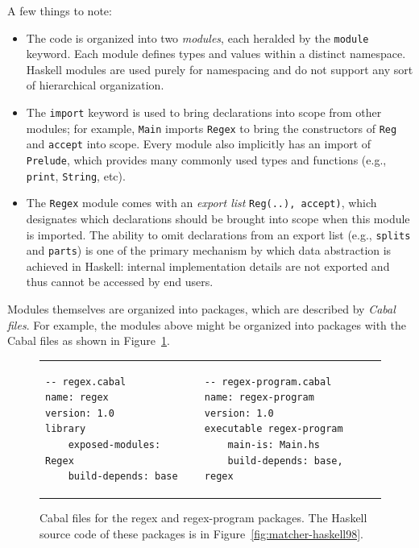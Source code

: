 A few things to note:

\begin{itemize}
    \item The code is organized into two \emph{modules}, each heralded
    by the \verb|module| keyword.  Each module defines types and values
    within a distinct namespace.  Haskell modules are used purely for
    namespacing and do not support any sort of hierarchical organization.

    \item The \verb|import| keyword is used to bring declarations into
    scope from other modules; for example, \verb|Main| imports \verb|Regex|
    to bring the constructors of \verb|Reg| and \verb|accept| into scope.
    Every module also implicitly has an import of \verb|Prelude|, which
    provides many commonly used types and functions (e.g., \verb|print|,
    \verb|String|, etc).

    \item The \verb|Regex| module comes with an \emph{export list}
    \verb|Reg(..), accept)|, which designates which declarations should
    be brought into scope when this module is imported.  The ability to
    omit declarations from an export list (e.g., \verb|splits| and \verb|parts|)
    is one of the primary mechanism by which data abstraction is achieved in
    Haskell: internal implementation details are not exported and thus
    cannot be accessed by end users.
\end{itemize}

Modules themselves are organized into packages, which are described by
\emph{Cabal files}.  For example, the modules above might be organized into
packages with the Cabal files as shown in Figure~\ref{fig:matcher-packages}.

\begin{figure}
\begin{tabular}{p{} p{}}
\begin{verbatim}
-- regex.cabal
name: regex
version: 1.0
library
    exposed-modules: Regex
    build-depends: base
\end{verbatim}
&
\begin{verbatim}
-- regex-program.cabal
name: regex-program
version: 1.0
executable regex-program
    main-is: Main.hs
    build-depends: base, regex
\end{verbatim}
\end{tabular}
\caption{Cabal files for the regex and regex-program packages. The Haskell source code
of these packages is in Figure~\ref{fig:matcher-haskell98}.}
\label{fig:matcher-packages}
\end{figure}

